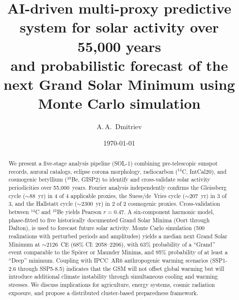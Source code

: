 \documentclass[twocolumn,preprintnumbers,amsmath,amssymb]{revtex4-2}
\begin{document}
\title{AI-driven multi-proxy predictive system for solar activity over 55,000 years\\and probabilistic forecast of the next Grand Solar Minimum using Monte Carlo simulation}

\author{A.\,A.~Dmitriev}

\date{\today}

\begin{abstract}
We present a five-stage analysis pipeline (SOL-1) combining pre-telescopic sunspot records, auroral catalogs, eclipse corona morphology, radiocarbon ($^{14}$C, IntCal20), and cosmogenic beryllium ($^{10}$Be, GISP2) to identify and cross-validate solar activity periodicities over 55,000~years. Fourier analysis independently confirms the Gleissberg cycle ($\sim$88~yr) in 4 of 4 applicable proxies, the Suess/de~Vries cycle ($\sim$207~yr) in 3 of 3, and the Hallstatt cycle ($\sim$2300~yr) in 2 of 2 cosmogenic proxies. Cross-validation between $^{14}$C and $^{10}$Be yields Pearson $r = 0.47$. A six-component harmonic model, phase-fitted to five historically documented Grand Solar Minima (Oort through Dalton), is used to forecast future solar activity. Monte Carlo simulation (500 realizations with perturbed periods and amplitudes) yields a median next Grand Solar Minimum at $\sim$2126~CE (68\% CI: 2058--2206), with 63\% probability of a ``Grand'' event comparable to the Sp\"orer or Maunder Minima, and 95\% probability of at least a ``Deep'' minimum. Coupling with IPCC~AR6 anthropogenic warming scenarios (SSP1-2.6 through SSP5-8.5) indicates that the GSM will not offset global warming but will introduce additional climate instability through simultaneous cooling and warming stresses. We discuss implications for agriculture, energy systems, cosmic radiation exposure, and propose a distributed cluster-based preparedness framework.
\end{abstract}


\maketitle
\end{document}
